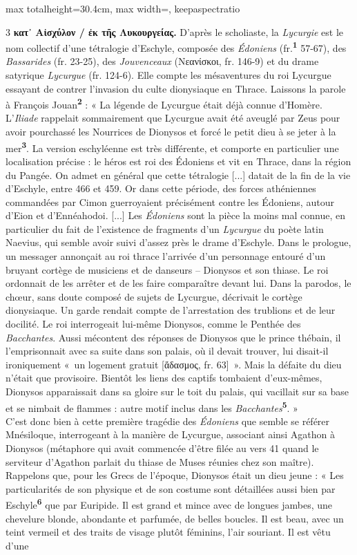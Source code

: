 \documentclass[11pt,twoside]{book}
\newcommand{\italique}[1]{\textit{#1}}
\newcommand{\marqueur}[1]{\textsuperscript{\color{rubricRed}\textbf{#1}}}
\begin{document}
\begin{adjustbox}{max totalheight=30.4cm, max width=\textwidth, keepaspectratio}
\begin{minipage}{\textwidth}
{\begin{multicols}{3}
 \textbf{κατ᾽ Αἰσχύλον / ἐκ τῆς Λυκουργείας.} D'après le scholiaste, la \italique{Lycurgie} est le nom collectif d'une tétralogie d'Eschyle, composée des \italique{Édoniens} (fr.\marqueur{1} 57-67), des \italique{Bassarides} (fr. 23-25), des \italique{Jouvenceaux} (Νεανίσκοι, fr. 146-9) et du drame satyrique \italique{Lycurgue} (fr. 124-6). Elle compte les mésaventures du roi Lycurgue essayant de contrer l'invasion du culte dionysiaque en Thrace. Laissons la parole à François Jouan\marqueur{2} : « La légende de Lycurgue était déjà connue d'Homère. L'\italique{Iliade} rappelait sommairement que Lycurgue avait été aveuglé par Zeus pour avoir pourchassé les Nourrices de Dionysos et forcé le petit dieu à se jeter à la mer\marqueur{3}. La version eschyléenne est très différente, et comporte en particulier une localisation précise : le héros est roi des Édoniens et vit en Thrace, dans la région du Pangée. On admet en général que cette tétralogie [...] datait de la fin de la vie d'Eschyle, entre 466 et 459. Or dans cette période, des forces athéniennes commandées par Cimon guerroyaient précisément contre les Édoniens, autour d'Eion et d'Ennéahodoi. [...] Les \italique{Édoniens} sont la pièce la moins mal connue, en particulier du fait de l'existence de fragments d'un \italique{Lycurgue} du poète latin Naevius, qui semble avoir suivi d'assez près le drame d'Eschyle. Dans le prologue, un messager annonçait au roi thrace l'arrivée d'un personnage entouré d'un bruyant cortège de musiciens et de danseurs – Dionysos et son thiase. Le roi ordonnait de les arrêter et de les faire comparaître devant lui. Dans la parodos, le chœur, sans doute composé de sujets de Lycurgue, décrivait le cortège dionysiaque. Un garde rendait compte de l'arrestation des trublions et de leur docilité. Le roi interrogeait lui-même Dionysos, comme le Penthée des \italique{Bacchantes}. Aussi mécontent des réponses de Dionysos que le prince thébain, il l'emprisonnait avec sa suite dans son palais, où il devait trouver, lui disait-il ironiquement «~un logement gratuit [ἄδασμος, fr. 63]~». Mais la défaite du dieu n'était que provisoire. Bientôt les liens des captifs tombaient d'eux-mêmes, Dionysos apparaissait dans sa gloire sur le toit du palais, qui vacillait sur sa base et se nimbait de flammes : autre motif inclus dans les \italique{Bacchantes}\marqueur{5}. » \\ C'est donc bien à cette première tragédie des \italique{Édoniens} que semble se référer Mnésiloque, interrogeant à la manière de Lycurgue, associant ainsi Agathon à Dionysos (métaphore qui avait commencée d'être filée au vers 41 quand le serviteur d'Agathon parlait du thiase de Muses réunies chez son maître). Rappelons que, pour les Grecs de l'époque, Dionysos était un dieu jeune : « Les particularités de son physique et de son costume sont détaillées aussi bien par Eschyle\marqueur{6} que par Euripide. Il est grand et mince avec de longues jambes, une chevelure blonde, abondante et parfumée, de belles boucles. Il est beau, avec un teint vermeil et des traits de visage plutôt féminins, l'air souriant. Il est vêtu d'une 
\end{multicols}}
\end{minipage}
\end{adjustbox}
\end{document}
